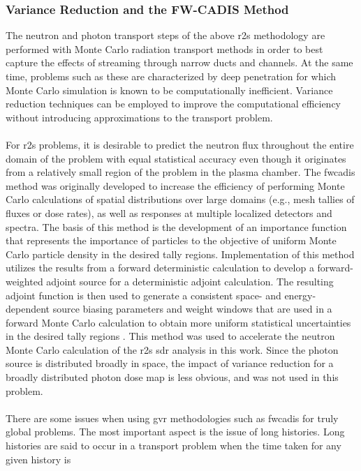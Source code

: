 \documentclass[12pt]{article}
\begin{document}
\subsubsection{Variance Reduction and the FW-CADIS Method}
The neutron and photon transport steps of the above \gls{r2s} methodology are
performed with Monte Carlo radiation transport methods in order to best
capture the effects of streaming through narrow ducts and channels.  At the
same time, problems such as these are characterized by deep penetration for
which Monte Carlo simulation is known to be computationally inefficient.
Variance reduction techniques can be employed to improve the computational
efficiency without introducing approximations to the transport problem.
\\
\\
For \gls{r2s} problems, it is desirable to predict the neutron flux throughout
the entire domain of the problem with equal statistical accuracy even though
it originates from a relatively small region of the problem in the plasma
chamber.  The \gls{fwcadis} method was originally developed to increase the
efficiency of performing Monte Carlo calculations of spatial distributions
over large domains (e.g., mesh tallies of fluxes or dose rates), as well as
responses at multiple localized detectors and spectra. The basis of this
method is the development of an importance function that represents the
importance of particles to the objective of uniform Monte Carlo particle
density in the desired tally regions.  Implementation of this method utilizes
the results from a forward deterministic calculation to develop a
forward-weighted adjoint source for a deterministic adjoint calculation. The
resulting adjoint function is then used to generate a consistent space- and
energy-dependent source biasing parameters and weight windows that are used in
a forward Monte Carlo calculation to obtain more uniform statistical
uncertainties in the desired tally regions \cite{wagnerNSEFWCADIS}. This
method was used to accelerate the neutron Monte Carlo calculation of
the \gls{r2s} \gls{sdr} analysis in this work. Since the photon source is
distributed broadly in space, the impact of variance reduction for a broadly
distributed photon dose map is less obvious, and was not used in this problem.
\\
\\
There are some issues when using \gls{gvr} methodologies such as \gls{fwcadis}
for truly global problems. The most 
important aspect is the issue of long histories. Long histories are said to 
occur in a transport problem when the time taken for any given history is 
\end{document}

